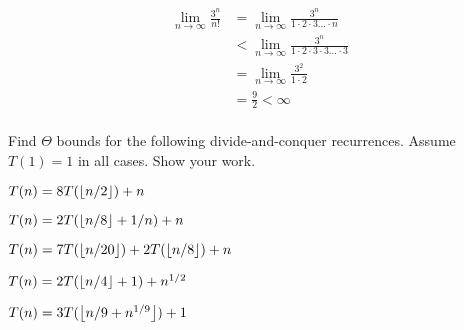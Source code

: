 \documentclass[12pt,twoside]{article}
\begin{document}
\begin{problem}{15}
{\begin{equation}
\begin{split}
\lim_{n\to\infty}  \frac{3^n}{n!} &= \lim_{n\to\infty} \frac{3^n}{1 \cdot 2 \cdot 3 \ldots \cdot n} \\
& < \lim_{n\to\infty} \frac{3^n}{1 \cdot 2 \cdot 3 \cdot 3 \ldots \cdot 3} \\
&= \lim_{n\to\infty} \frac{3^2}{1 \cdot 2} \\
&= \frac{9}{2} < \infty \\ 
\end{split}
\end{equation}

}
\eparts
\end{problem}




\begin{problem}{25}
Find $\Theta$ bounds for the following divide-and-conquer recurrences.
Assume $T(1) = 1$ in all cases.  Show your work.
\begin{problemparts}

 $T(n) = 8T(\left\lfloor n/2\right\rfloor) + n$

 $T(n) = 2T(\left\lfloor n/8\right\rfloor + 1/n)+n$

 $T(n) = 7T(\left\lfloor n/20\right\rfloor) + 2T(\left\lfloor n/8\right\rfloor) + n$

 $T(n) = 2T(\left\lfloor n/4\right\rfloor+1)+n^{1/2}$

 $T(n) = 3T(\left\lfloor n/9+n^{1/9}\right\rfloor) + 1$

\end{problemparts}

\end{problem}
\end{document}

